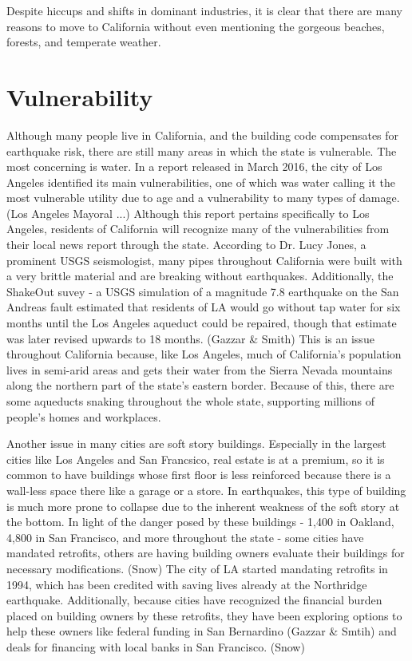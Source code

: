 \documentclass[12pt]{article}
\begin{document}
Despite hiccups and shifts in dominant industries, it is clear that there are many reasons to move to California without even mentioning the gorgeous beaches, forests, and temperate weather.

\section*{Vulnerability}
Although many people live in California, and the building code compensates for earthquake risk, there are still many areas in which the state is vulnerable.  The most concerning is water.  In a report released in March 2016, the city of Los Angeles identified its main vulnerabilities, one of which was water calling it the most vulnerable utility due to age and a vulnerability to many types of damage. (Los Angeles Mayoral ...)  Although this report pertains specifically to Los Angeles, residents of California will recognize many of the vulnerabilities from their local news report through the state.  According to Dr. Lucy Jones, a prominent USGS seismologist, many pipes throughout California were built with a very brittle material and are breaking without earthquakes.  Additionally, the ShakeOut suvey - a USGS simulation of a magnitude 7.8 earthquake on the San Andreas fault estimated that residents of LA would go without tap water for six months until the Los Angeles aqueduct could be repaired, though that estimate was later revised upwards to 18 months. (Gazzar \& Smith)  This is an issue throughout California because, like Los Angeles, much of California's population lives in semi-arid areas and gets their water from the Sierra Nevada mountains along the northern part of the state's eastern border.  Because of this, there are some aqueducts snaking throughout the whole state, supporting millions of people's homes and workplaces.

Another issue in many cities are soft story buildings.  Especially in the largest cities like Los Angeles and San Francsico, real estate is at a premium, so it is common to have buildings whose first floor is less reinforced because there is a wall-less space there like a garage or a store. In earthquakes, this type of building is much more prone to collapse due to the inherent weakness of the soft story at the bottom. In light of the danger posed by these buildings - 1,400 in Oakland, 4,800 in San Francisco, and more throughout the state - some cities have mandated retrofits, others are having building owners evaluate their buildings for necessary modifications. (Snow)  The city of LA started mandating retrofits in 1994, which has been credited with saving lives already at the Northridge earthquake.  Additionally, because cities have recognized the financial burden placed on building owners by these retrofits, they have been exploring options to help these owners like federal funding in San Bernardino (Gazzar \& Smtih) and deals for financing with local banks in San Francisco. (Snow)
\end{document}
